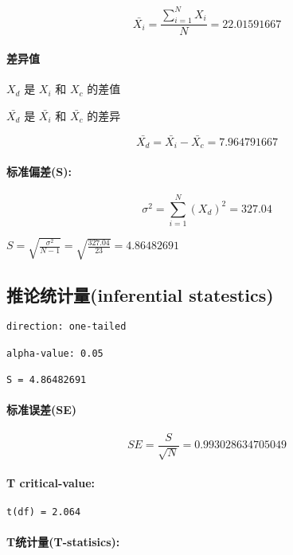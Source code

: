 \documentclass[11pt]{article}
\begin{document}
\[
\bar{X_i} = \frac{\sum\limits_{i=1}^N X_i}{N} = 22.01591667
\]

\paragraph{差异值}\label{ux5deeux5f02ux503c}

\(X_d\) 是 \(X_i\) 和 \(X_c\) 的差值

\(\bar{X_d}\) 是 \(\bar{X_i}\) 和 \(\bar{X_c}\) 的差异

\[\bar{X_d} = \bar{X_i} - \bar{X_c} = 7.964791667\]

\paragraph{标准偏差(S):}\label{ux6807ux51c6ux504fux5dees}

\[\sigma^2 = \sum\limits_{i=1}^N (X_d)^2 = 327.04\]

\(S = \sqrt {\frac {\sigma^2}{N-1}} = \sqrt {\frac {327.04}{23}} = 4.86482691\)

    \subsection{推论统计量(inferential
statestics)}\label{ux63a8ux8bbaux7edfux8ba1ux91cfinferential-statestics}

\begin{verbatim}
direction: one-tailed

alpha-value: 0.05

S = 4.86482691
\end{verbatim}

\paragraph{标准误差(SE)}\label{ux6807ux51c6ux8befux5deese}

\[SE = \frac {S}{\sqrt{N}} = 0.993028634705049\]

\paragraph{T critical-value:}\label{t-critical-value}

\begin{verbatim}
t(df) = 2.064
\end{verbatim}

\paragraph{T统计量(T-statisics):}\label{tux7edfux8ba1ux91cft-statisics}
\end{document}
